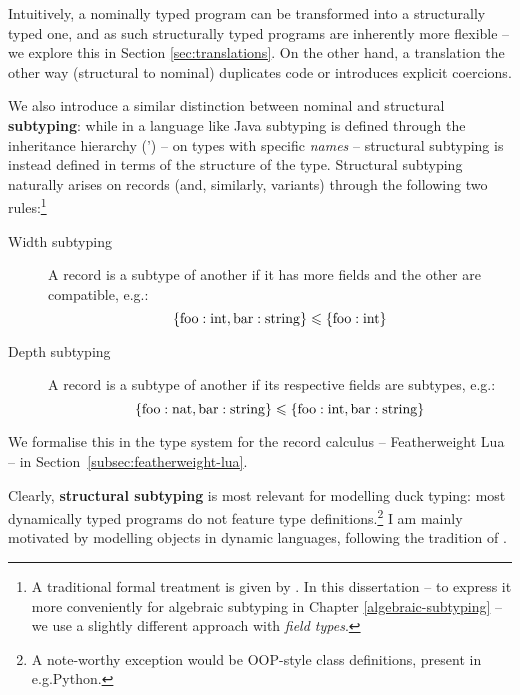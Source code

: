 Intuitively, a nominally typed program can be transformed into a structurally typed one, and as such structurally typed programs are inherently more flexible -- we explore this in Section \ref{sec:translations}. On the other hand, a translation the other way (structural to nominal) duplicates code or introduces explicit coercions.

We also introduce a similar distinction between nominal and structural \textbf{subtyping}: while in a language like Java subtyping is defined through the inheritance hierarchy (') -- on types with specific \emph{names} -- structural subtyping is instead defined in terms of the structure of the type. Structural subtyping naturally arises on records (and, similarly, variants) through the following two rules:\footnote{A traditional formal treatment is given by \textcite{tapl}. In this dissertation -- to express it more conveniently for algebraic subtyping in Chapter \ref{algebraic-subtyping} -- we use a slightly different approach with \emph{field types}.}
\begin{description}
    \item[Width subtyping] A record is a subtype of another if it has more fields and the other are compatible, e.g.: $$ \{ \mathrm{foo} : \mathrm{int}, \mathrm{bar} : \mathrm{string} \} \leqslant \{ \mathrm{foo} : \mathrm{int} \} $$
    \item[Depth subtyping] A record is a subtype of another if its respective fields are subtypes, e.g.:
    $$ \{ \mathrm{foo}: \mathrm{nat}, \mathrm{bar}: \mathrm{string} \} \leqslant \{ \mathrm{foo}: \mathrm{int}, \mathrm{bar}: \mathrm{string} \} $$
\end{description}

We formalise this in the type system for the record calculus -- Featherweight Lua -- in Section~\ref{subsec:featherweight-lua}.

Clearly, \textbf{structural subtyping} is most relevant for modelling duck typing: most dynamically typed programs do not feature type definitions.\footnote{A note-worthy exception would be OOP-style class definitions, present in e.g.\@ Python.} I am mainly motivated by modelling objects in dynamic languages, following the tradition of \textcite{cardelli-multiple-inheritance}.

